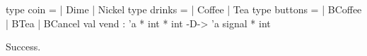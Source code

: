 \runverbatimtrue
{}
\begin{RunVerbatimMsg}
type coin   =  | Dime  | Nickel
type drinks   =  | Coffee  | Tea
type buttons   =  | BCoffee  | BTea  | BCancel
val vend : 'a * int * int -D-> 'a signal * int
\end{RunVerbatimMsg}
\begin{RunVerbatimErr}
Success.
\end{RunVerbatimErr}

